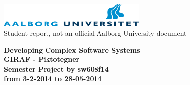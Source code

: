 \thispagestyle{empty} %
\begin{center}
	\includegraphics[height=1.2cm]{media/aau-logo}\\
	\vspace{0.25cm}
	Student report, not an official Aalborg University document
\end{center} 

\vspace{1cm}
\begin{center}
\textbf{\huge {Developing Complex Software Systems}} \\ \vspace{0.5cm}
\textbf{\Large {GIRAF - Piktotegner}} \\ \vspace{1cm}
\textbf{\large Semester Project by sw608f14}\\ \vspace{0.5cm}
\textbf{\normalsize from 3-2-2014 to 28-05-2014}\\
\end{center}

\vspace{0.25cm}


\thispagestyle{empty}

\newpage
\thispagestyle{empty}
\mbox{}



